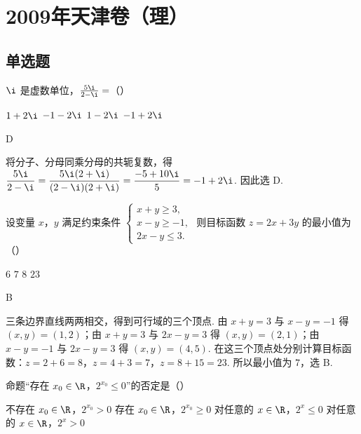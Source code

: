 \chapter{2009年天津卷（理）}

\section{单选题}

\begin{problem}
\(\i\) 是虚数单位，\(\frac{5\i}{2 - \i} =\)（\quad）

\choices
    {\(1 + 2\i\)}
    {\(-1 - 2\i\)}
    {\(1 - 2\i\)}
    {\(-1 + 2\i\)}
\end{problem}

\begin{answer}
D
\end{answer}

\begin{solution}
将分子、分母同乘分母的共轭复数，得
\(\dfrac{5\i}{2-\i}=\dfrac{5\i(2+\i)}{(2-\i)(2+\i)}=\dfrac{-5+10\i}{5}=-1+2\i\).
因此选 D.
\end{solution}

\begin{problem}
设变量 \(x\)，\(y\) 满足约束条件 \(\begin{cases}
x + y \geqslant 3,\\
x - y \geqslant -1,\\
2x - y \leqslant 3.
\end{cases}\) 则目标函数 \(z = 2x + 3y\) 的最小值为（\quad）

\choices
    {\(6\)}
    {\(7\)}
    {\(8\)}
    {\(23\)}
\end{problem}

\begin{answer}
B
\end{answer}

\begin{solution}
三条边界直线两两相交，得到可行域的三个顶点. 由 \(x+y=3\) 与 \(x-y=-1\) 得 \((x,y)=(1,2)\)；由 \(x+y=3\) 与 \(2x-y=3\) 得 \((x,y)=(2,1)\)；由 \(x-y=-1\) 与 \(2x-y=3\) 得 \((x,y)=(4,5)\). 在这三个顶点处分别计算目标函数：\(z=2+6=8\)，\(z=4+3=7\)，\(z=8+15=23\). 所以最小值为 \(7\)，选 B.
\end{solution}

\begin{problem}
命题“存在 \(x_0 \in \R\)，\(2^{x_0} \leqslant 0\)”的否定是（\quad）

\choices
    {不存在 \(x_0 \in \R\)，\(2^{x_0} > 0\)}
    {存在 \(x_0 \in \R\)，\(2^{x_0} \geqslant 0\)}
    {对任意的 \(x \in \R\)，\(2^x \leqslant 0\)}
    {对任意的 \(x \in \R\)，\(2^x > 0\)}
\end{problem}

